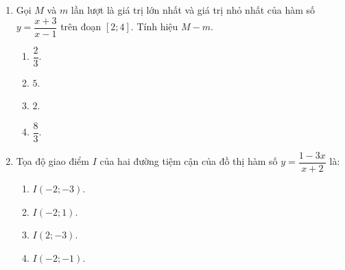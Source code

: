 \documentclass[12pt]{article}
\begin{document}
\begin{enumerate}[label=\textbf{Câu \arabic*.}, leftmargin=*]
\begin{center}
		\end{center}
		
		Gọi $M,m$ lần lượt là giá trị lớn nhất và giá trị nhỏ nhất của hàm số trên đoạn $[-2;2]$.
		Tính giá trị của biểu thức $P=2M-3m$		
		\begin{multicols}{4}
			\begin{enumerate}[label=\Alph*.]
				\item $5$.
				\item $6$.
				\item $8$.
				\item $10$.
			\end{enumerate}
		\end{multicols}
		
		\item Gọi $M$ và $m$ lần lượt là giá trị lớn nhất và giá trị nhỏ nhất của hàm số $y = \dfrac{x + 3}{x - 1}$ trên đoạn $[2; 4]$. Tính hiệu $M - m$.
		\begin{multicols}{4}
			\begin{enumerate}[label=\Alph*.]
				\item $\dfrac{2}{3}$.
				\item $5$.
				\item $2$.
				\item $\dfrac{8}{3}$.
			\end{enumerate}
		\end{multicols}
		
		\item Tọa độ giao điểm $I$ của hai đường tiệm cận của đồ thị hàm số $y = \dfrac{1 - 3x}{x + 2}$ là:
		\begin{multicols}{4}
			\begin{enumerate}[label=\Alph*.]
				\item $I(-2; -3)$.
				\item $I(-2; 1)$.
				\item $I(2; -3)$.
				\item $I(-2; -1)$.
			\end{enumerate}
		\end{multicols}
		

\end{enumerate}
\end{document}
